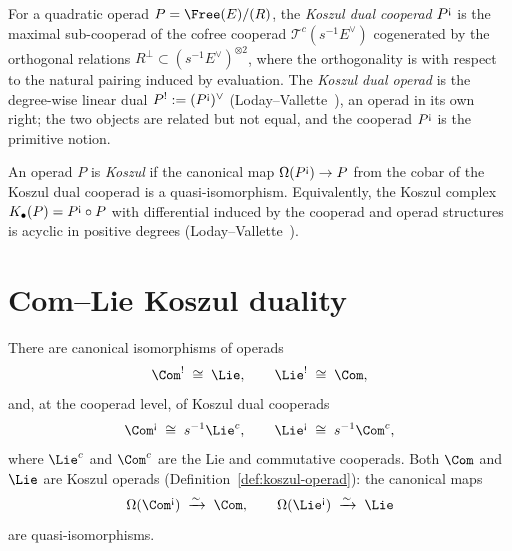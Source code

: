 \begin{definition}
\label{def:koszul-dual-cooperad}
For a quadratic operad $P = \Free(E)/(R)$, the
\emph{Koszul dual cooperad} $P^{\text{\textexclamdown}}$ is the
maximal sub-cooperad of the cofree cooperad
$\mathcal{T}^c(s^{-1}E^\vee)$ cogenerated by the orthogonal
relations $R^\perp \subset (s^{-1}E^\vee)^{\otimes 2}$, where the
orthogonality is with respect to the natural pairing induced by
evaluation. The \emph{Koszul dual operad} is the degree-wise
linear dual
$P^! := (P^{\text{\textexclamdown}})^\vee$ (Loday--Vallette~\cite[\S7.2]{LV12}),
an operad in its own right; the two objects are related but
not equal, and the cooperad $P^{\text{\textexclamdown}}$ is the
primitive notion.
\end{definition}

\begin{definition}\label{def:koszul-operad}
An operad $P$ is \emph{Koszul} if the canonical map
$\Omega(P^{\text{\textexclamdown}}) \to P$ from the cobar of the
Koszul dual cooperad is a quasi-isomorphism. Equivalently, the
Koszul complex
$K_\bullet(P) = P^{\text{\textexclamdown}} \circ P$
with differential induced by the cooperad and operad structures is
acyclic in positive degrees (Loday--Vallette~\cite[\S7.4]{LV12}).
\end{definition}

\section{Com--Lie Koszul duality}

\begin{theorem}\label{thm:com-lie}
There are canonical isomorphisms of operads
\[
\Com^{!} \;\cong\; \Lie,
\qquad
\Lie^{!} \;\cong\; \Com,
\]
and, at the cooperad level, of Koszul dual cooperads
\[
\Com^{\text{\textexclamdown}}
 \;\cong\; s^{-1}\Lie^c,
\qquad
\Lie^{\text{\textexclamdown}}
 \;\cong\; s^{-1}\Com^c,
\]
where $\Lie^c$ and $\Com^c$ are the Lie and commutative cooperads.
Both $\Com$ and $\Lie$ are Koszul operads
(Definition~\ref{def:koszul-operad}): the canonical maps
\[
\Omega(\Com^{\text{\textexclamdown}})
 \;\xrightarrow{\sim}\; \Com,
\qquad
\Omega(\Lie^{\text{\textexclamdown}})
 \;\xrightarrow{\sim}\; \Lie
\]
are quasi-isomorphisms.
\end{theorem}


